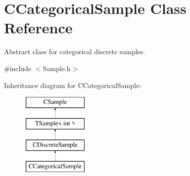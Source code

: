 \hypertarget{class_c_categorical_sample}{\section{C\-Categorical\-Sample Class Reference}
\label{class_c_categorical_sample}
}


Abstract class for categorical discrete samples.  




{\ttfamily \#include $<$Sample.\-h$>$}

Inheritance diagram for C\-Categorical\-Sample\-:\begin{figure}[H]
\begin{center}
\leavevmode
\includegraphics[height=4.000000cm]{class_c_categorical_sample}
\end{center}
\end{figure}
